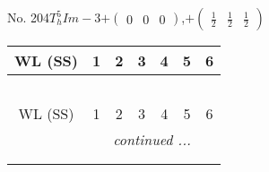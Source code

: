 \documentclass[fleqn,9pt,landscape]{jsarticle}
\begin{document}
\newpage
No. 204\quad$T_{h}^{5}$\quad$Im-3$\quad[ cubic ]\quad$+\begin{pmatrix} 0 & 0 & 0 \end{pmatrix}$,\quad $+\begin{pmatrix} \frac{1}{2} & \frac{1}{2} & \frac{1}{2} \end{pmatrix}$
\begin{center}
\renewcommand{\arraystretch}{1.2}
\begin{longtable}{ccccccc}
 \hline \hline
WL (SS) & 1 & 2 & 3 & 4 & 5 & 6 \\ \hline \endfirsthead

\multicolumn{6}{l}{\tablename\ \thetable{}} \\
 \hline \hline
WL (SS) & 1 & 2 & 3 & 4 & 5 & 6 \\ \hline \endhead

 \hline \hline
\multicolumn{6}{r}{\footnotesize\it continued ...} \\ \endfoot

 \hline \hline
\multicolumn{6}{r}{} \\ \endlastfoot


\end{longtable}
\end{center}
\end{document}

